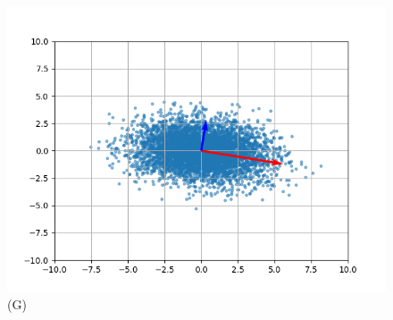 \documentclass{article}
\begin{document}
\begin{figure}[!htb]
\begin{minipage}{0.24\textwidth}
                \includegraphics[width=1\linewidth]{../Cov_6.png}
                \caption{(G)}
        \end{minipage}
\end{figure}
\pagebreak
\end{document}
